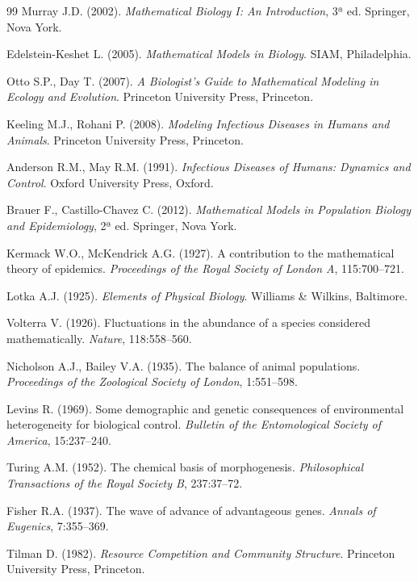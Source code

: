 \begin{thebibliography}{99}
 Murray J.D. (2002). \textit{Mathematical Biology I: An
Introduction}, 3ª ed. Springer, Nova York.

 Edelstein-Keshet L. (2005). \textit{Mathematical Models
in Biology}. SIAM, Philadelphia.

 Otto S.P., Day T. (2007). \textit{A Biologist's Guide to
Mathematical Modeling in Ecology and Evolution}. Princeton University Press,
Princeton.

 Keeling M.J., Rohani P. (2008). \textit{Modeling Infectious
Diseases in Humans and Animals}. Princeton University Press, Princeton.

 Anderson R.M., May R.M. (1991). \textit{Infectious Diseases
of Humans: Dynamics and Control}. Oxford University Press, Oxford.

 Brauer F., Castillo-Chavez C. (2012). \textit{Mathematical
Models in Population Biology and Epidemiology}, 2ª ed. Springer, Nova York.

 Kermack W.O., McKendrick A.G. (1927). A contribution to the
mathematical theory of epidemics. \textit{Proceedings of the Royal Society
of London A}, 115:700--721.

 Lotka A.J. (1925). \textit{Elements of Physical Biology}.
Williams \& Wilkins, Baltimore.

 Volterra V. (1926). Fluctuations in the abundance of a
species considered mathematically. \textit{Nature}, 118:558--560.

 Nicholson A.J., Bailey V.A. (1935). The balance of animal
populations. \textit{Proceedings of the Zoological Society of London},
1:551--598.

 Levins R. (1969). Some demographic and genetic consequences
of environmental heterogeneity for biological control. \textit{Bulletin of
the Entomological Society of America}, 15:237--240.

 Turing A.M. (1952). The chemical basis of morphogenesis.
\textit{Philosophical Transactions of the Royal Society B}, 237:37--72.

 Fisher R.A. (1937). The wave of advance of advantageous
genes. \textit{Annals of Eugenics}, 7:355--369.

 Tilman D. (1982). \textit{Resource Competition and Community
Structure}. Princeton University Press, Princeton.


\end{thebibliography}
